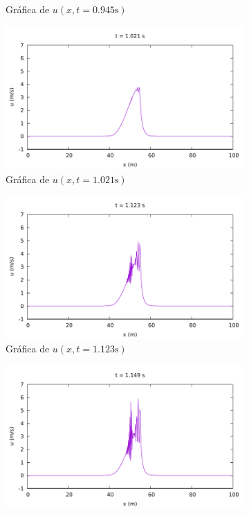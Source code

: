 \documentclass[12pt]{article}
\begin{document}
\begin{figure}[ht]
\begin{subfigure}{0.4\textwidth}
			\caption*{Gráfica de $u(x,t=0.945\unit{\second})$}
			\label{fig:b1ddf3}
		\end{subfigure}\hfill
		\begin{subfigure}{0.4\textwidth}
			\centering
			\includegraphics[width=\textwidth]{../burgers1DDF/results/frame040.pdf}
			\caption*{Gráfica de $u(x,t=1.021\unit{\second})$}
			\label{fig:b1ddf4}
		\end{subfigure}\par
		\begin{subfigure}{0.4\textwidth}
			\centering
			\includegraphics[width=\textwidth]{../burgers1DDF/results/frame044.pdf}
			\caption*{Gráfica de $u(x,t=1.123\unit{\second})$}
			\label{fig:b1ddf5}
		\end{subfigure}\hfill
		\begin{subfigure}{0.4\textwidth}
			\centering
			\includegraphics[width=\textwidth]{../burgers1DDF/results/frame045.pdf}

\end{subfigure}
\end{figure}
\end{document}
